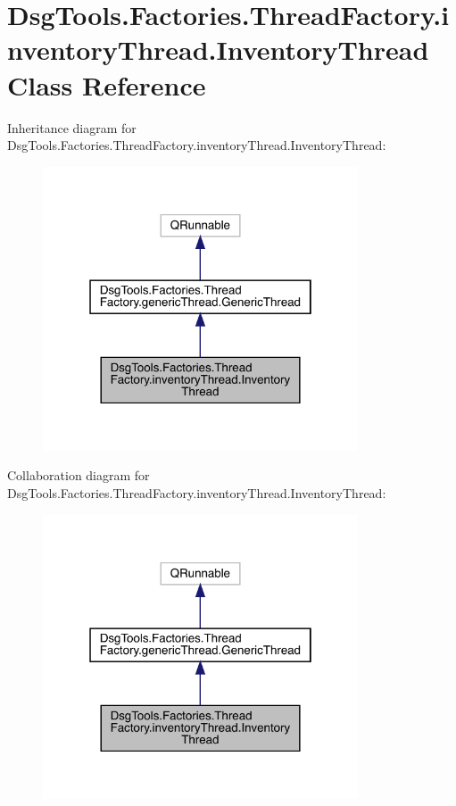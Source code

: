 \hypertarget{class_dsg_tools_1_1_factories_1_1_thread_factory_1_1inventory_thread_1_1_inventory_thread}{}\section{Dsg\+Tools.\+Factories.\+Thread\+Factory.\+inventory\+Thread.\+Inventory\+Thread Class Reference}
\label{class_dsg_tools_1_1_factories_1_1_thread_factory_1_1inventory_thread_1_1_inventory_thread}


Inheritance diagram for Dsg\+Tools.\+Factories.\+Thread\+Factory.\+inventory\+Thread.\+Inventory\+Thread\+:
\nopagebreak
\begin{figure}[H]
\begin{center}
\leavevmode
\includegraphics[width=265pt]{class_dsg_tools_1_1_factories_1_1_thread_factory_1_1inventory_thread_1_1_inventory_thread__inherit__graph}
\end{center}
\end{figure}


Collaboration diagram for Dsg\+Tools.\+Factories.\+Thread\+Factory.\+inventory\+Thread.\+Inventory\+Thread\+:
\nopagebreak
\begin{figure}[H]
\begin{center}
\leavevmode
\includegraphics[width=265pt]{class_dsg_tools_1_1_factories_1_1_thread_factory_1_1inventory_thread_1_1_inventory_thread__coll__graph}
\end{center}
\end{figure}
